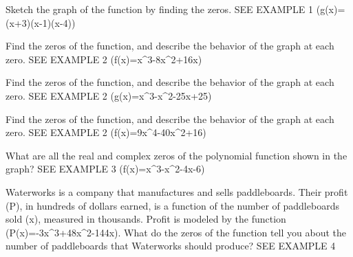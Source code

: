 \documentclass{article}
\newenvironment{practice}[2]{}{}        %
\newcommand{\answer}[1]{}               %
\newcommand{\placeholder}[2]{}          %
\newcommand{\te}[1]{}                   %
\begin{document}
\begin{practice}{13}{1}
Sketch the graph of the function by finding the zeros. SEE EXAMPLE 1
(g(x)=(x+3)(x-1)(x-4))
\placeholder{graph}{Printed answer 13: red cubic crossing near -1,0,4, local maximum slightly above x-axis and minimum near (2.5,-40); x labels -4,-2,O,2; y labels 40,20,-20,-40.}
\answer{See graph.}
\te{The printed graph has the zeros of item 12, not item 13; retained under its printed number.}
\end{practice}
\begin{practice}{14}{1}
Find the zeros of the function, and describe the behavior of the graph at each zero. SEE EXAMPLE 2
(f(x)=x^3-8x^2+16x)
\answer{0, 4; The graph crosses the (x)-axis at 0, and it touches the (x)-axis at 4.}
\end{practice}
\begin{practice}{15}{1}
Find the zeros of the function, and describe the behavior of the graph at each zero. SEE EXAMPLE 2
(g(x)=x^3-x^2-25x+25)
\answer{(-5), 1, 5; The graph crosses the (x)-axis at (-5), 1, and 5.}
\end{practice}
\begin{practice}{16}{1}
Find the zeros of the function, and describe the behavior of the graph at each zero. SEE EXAMPLE 2
(f(x)=9x^4-40x^2+16)
\answer{(\pm\frac{2}{3}), (\pm4); The graph crosses the (x)-axis at each zero.}
\te{The printed key gives plus/minus 4; the corresponding roots of the given polynomial are plus/minus 2.}
\end{practice}
\begin{practice}{17}{1}
What are all the real and complex zeros of the polynomial function shown in the graph? SEE EXAMPLE 3
(f(x)=x^3-x^2-4x-6)
\placeholder{graph}{Red cubic crossing x-axis at 3; local maximum near (-1,-4) and minimum near (1.5,-11); x labels -4,-2,O,2,4; y labels 8,4,-8.}
\answer{The zeros of the polynomial function are 3, (-1+i), and (-1-i).}
\end{practice}
\begin{practice}{18}{2}
Waterworks is a company that manufactures and sells paddleboards. Their profit (P), in hundreds of dollars earned, is a function of the number of paddleboards sold (x), measured in thousands. Profit is modeled by the function (P(x)=-3x^3+48x^2-144x). What do the zeros of the function tell you about the number of paddleboards that Waterworks should produce? SEE EXAMPLE 4
\answer{When (P(x)) is positive, the company earns a profit. (P(x)>0) for (4<x<12), so the company should make between 4,000 and 12,000 paddleboards.}
\end{practice}
\end{document}
